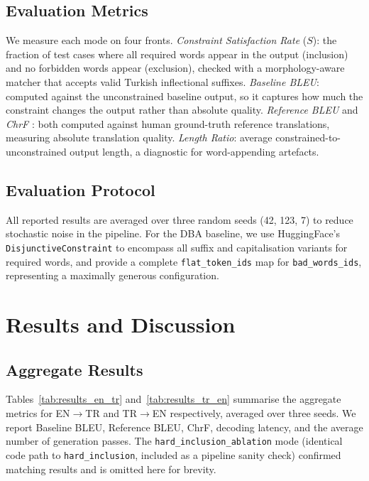 \documentclass{tlp}
\begin{document}
\subsection{Evaluation Metrics}

We measure each mode on four fronts. \emph{Constraint Satisfaction Rate} ($S$): the
fraction of test cases where all required words appear in the output (inclusion) and
no forbidden words appear (exclusion), checked with a morphology-aware matcher that
accepts valid Turkish inflectional suffixes. \emph{Baseline BLEU}: computed against
the unconstrained baseline output, so it captures how much the constraint changes the
output rather than absolute quality. \emph{Reference BLEU} \citep{papineni2002bleu}
and \emph{ChrF} \citep{popovic2015chrf}: both computed against human ground-truth
reference translations, measuring absolute translation quality. \emph{Length Ratio}:
average constrained-to-unconstrained output length, a diagnostic for word-appending
artefacts.

\subsection{Evaluation Protocol}

All reported results are averaged over three random seeds (42, 123, 7) to reduce
stochastic noise in the pipeline. For the DBA baseline, we use HuggingFace's
\texttt{DisjunctiveConstraint} to encompass all suffix and capitalisation variants
for required words, and provide a complete \texttt{flat\_token\_ids} map for
\texttt{bad\_words\_ids}, representing a maximally generous configuration.


\section{Results and Discussion}

\subsection{Aggregate Results}

Tables~\ref{tab:results_en_tr} and~\ref{tab:results_tr_en} summarise the aggregate
metrics for EN$\rightarrow$TR and TR$\rightarrow$EN respectively, averaged over three
seeds. We report Baseline BLEU, Reference BLEU, ChrF, decoding latency, and the
average number of generation passes. The \texttt{hard\_inclusion\_ablation} mode
(identical code path to \texttt{hard\_inclusion}, included as a pipeline sanity
check) confirmed matching results and is omitted here for brevity.
\end{document}
